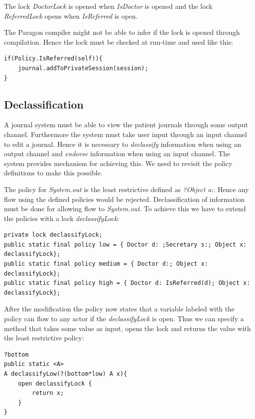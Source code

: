 The lock \emph{DoctorLock} is opened when \emph{IsDoctor} is opened and the lock \emph{ReferredLock} opens when \emph{IsReferred} is open. 

The Paragon compiler might not be able to infer if the lock is opened through compilation. Hence the lock must be checked at run-time and used like this:

\begin{lstlisting}
if(Policy.IsReferred(self)){
	journal.addToPrivateSession(session);
}
\end{lstlisting}



\subsection{Declassification}
A journal system must be able to view the patient journals through some output channel. Furthermore the system must take user input through an input channel to edit a journal. Hence it is necessary to \emph{declassify} information when using an output channel and \emph{endorse} information when using an input channel. The system provides mechanism for achieving this. We need to revisit the policy definitions to make this possible. 

The policy for \emph{System.out} is the least restrictive defined as \emph{?{Object a:}}.
Hence any flow using the defined policies would be rejected. Declassification of information must be done for allowing flow to \emph{System.out}. To achieve this we have to extend the policies with a lock \emph{declassifyLock}:

\begin{lstlisting}
private lock declassifyLock;
public static final policy low = { Doctor d: ;Secretary s:; Object x: declassifyLock};
public static final policy medium = { Doctor d:; Object x: declassifyLock};
public static final policy high = { Doctor d: IsReferred(d); Object x: declassifyLock};
\end{lstlisting}

After the modification the policy now states that a variable labeled with the policy can flow to any actor if the \emph{declassifyLock} is open. Thus we can specify a method that takes some value as input, opens the lock and returns the value with the least restrictive policy:

\begin{lstlisting}
?bottom
public static <A> 
A declassifyLow(?(bottom*low) A x){
	open declassifyLock {
		return x;
	}
}
\end{lstlisting}

